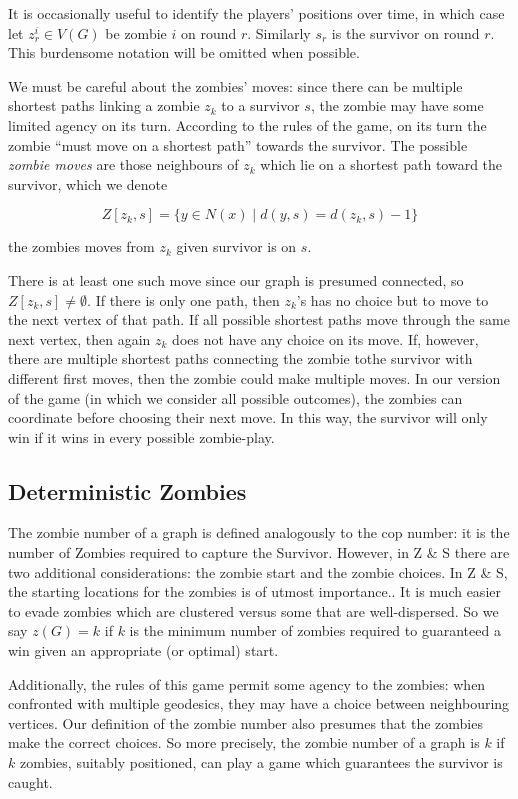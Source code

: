 It is occasionally useful to identify the players' positions over time, in which
case let $z_r^i \in V(G)$ be zombie $i$ on round $r$. Similarly $s_r$ is the
survivor on round $r$. This burdensome notation will be omitted when possible.

We must be careful about the zombies' moves: since there can be multiple shortest paths linking a zombie $z_k$ to a survivor $s$, the zombie may have some limited agency on its turn. According to the rules of the game, on its turn the zombie
``must move on a shortest path'' towards the survivor. The possible \textit{zombie moves}
are those neighbours of $z_k$ which lie on a shortest path toward the survivor, which we denote

\[ Z[z_k, s] = \{ y \in N(x) \mid d(y, s) = d(z_k, s) - 1 \} \]

the zombies moves from $z_k$ given survivor is on $s$.

There is at least one such move since our graph is presumed connected,
so $Z[z_k,s] \neq \emptyset$. If there is only one path, then $z_k$'s has no choice but to move to the next vertex of that path. If all possible shortest paths move through the same next vertex, then again $z_k$ does not have any choice on its move. If, however, there are multiple shortest paths connecting the zombie tothe survivor with different first moves, then the zombie could make multiple moves. In our version of the game (in which we consider all possible outcomes), the zombies can coordinate before choosing their next move. In this way, the survivor will only win if it wins in every possible zombie-play.

\subsection{Deterministic Zombies}

The zombie number of a graph is defined analogously to the cop number: it is the number of Zombies
required to capture the Survivor. However, in Z \& S there are two additional considerations:
the zombie start and the zombie choices.
In Z \& S, the starting locations for the zombies is of utmost importance..
It is much easier to evade zombies which are clustered versus some
that are well-dispersed. So we say $z(G) = k$ if $k$ is the minimum number of
zombies required to guaranteed a win given an appropriate (or optimal) start.

Additionally, the rules of this game permit
some agency to the zombies: when confronted with multiple geodesics, they may have
a choice between neighbouring vertices. Our definition of the zombie number also presumes that
the zombies make the correct choices. So more precisely, the zombie number of a
graph is $k$ if $k$ zombies, suitably positioned, can play a game which guarantees the survivor
is caught.

